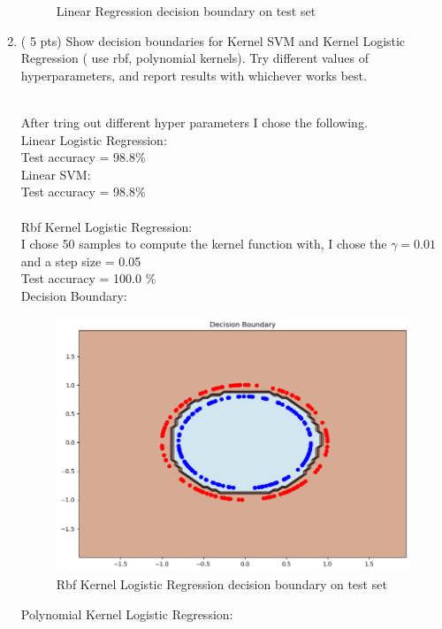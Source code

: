 \documentclass[a4paper]{article}
\theoremstyle{definition}
\newenvironment{soln}{
    \leavevmode\color{blue}\ignorespaces
}{}
\begin{document}
\begin{enumerate}
\begin{soln}
\begin{figure}[H]
            \caption{ Linear Regression decision boundary on test set}
        \end{figure}
    \end{soln}
\item ( 5 pts) Show decision boundaries for Kernel SVM and Kernel Logistic Regression ( use rbf, polynomial
kernels). Try different values of hyperparameters, and report results with whichever works best.
\begin{soln}
    \\ After tring out different hyper parameters I chose the following.
    \\ {\fontsize{10pt}{12pt}\selectfont Linear Logistic Regression:} 
    \\ Test accuracy = 98.8\%
    \\
    {\fontsize{10pt}{12pt}\selectfont Linear SVM:} 
    \\ Test accuracy = 98.8\%
    \\
    \\ {\fontsize{10pt}{12pt}\selectfont Rbf Kernel Logistic Regression:}
    \\ I chose 50 samples to compute the kernel function with, I chose the $\gamma = 0.01$ and a step size = 0.05
    \\ Test accuracy = 100.0 \%
    \\ Decision Boundary:
    \begin{figure}[H]
        \includegraphics[width=\textwidth]{images/circles-rbf-lr.png}
        \caption{ Rbf Kernel Logistic Regression decision boundary on test set}
    \end{figure}
    {\fontsize{10pt}{12pt}\selectfont Polynomial Kernel Logistic Regression:} 

\end{soln}
\end{enumerate}
\end{document}
